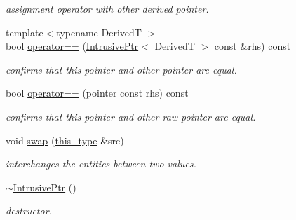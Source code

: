 \begin{DoxyCompactItemize}
\begin{DoxyCompactList}\small\item\em assignment operator with other derived pointer. \end{DoxyCompactList}\item 
\hypertarget{classhryky_1_1_intrusive_ptr_a9dde6dfd712df0d745d88494ab14354a}{{\footnotesize template$<$typename Derived\-T $>$ }\\bool \hyperlink{classhryky_1_1_intrusive_ptr_a9dde6dfd712df0d745d88494ab14354a}{operator==} (\hyperlink{classhryky_1_1_intrusive_ptr}{Intrusive\-Ptr}$<$ Derived\-T $>$ const \&rhs) const }\label{classhryky_1_1_intrusive_ptr_a9dde6dfd712df0d745d88494ab14354a}

\begin{DoxyCompactList}\small\item\em confirms that this pointer and other pointer are equal. \end{DoxyCompactList}\item 
\hypertarget{classhryky_1_1_intrusive_ptr_a8bc19fcb51130f7acfc810eddd01b1e7}{bool \hyperlink{classhryky_1_1_intrusive_ptr_a8bc19fcb51130f7acfc810eddd01b1e7}{operator==} (pointer const rhs) const }\label{classhryky_1_1_intrusive_ptr_a8bc19fcb51130f7acfc810eddd01b1e7}

\begin{DoxyCompactList}\small\item\em confirms that this pointer and other raw pointer are equal. \end{DoxyCompactList}\item 
\hypertarget{classhryky_1_1_intrusive_ptr_ab60b6a55a688776b82510c08c614709c}{void \hyperlink{classhryky_1_1_intrusive_ptr_ab60b6a55a688776b82510c08c614709c}{swap} (\hyperlink{classhryky_1_1_intrusive_ptr_a0fb00a7eafa8939e21653f677d1b2989}{this\-\_\-type} \&src)}\label{classhryky_1_1_intrusive_ptr_ab60b6a55a688776b82510c08c614709c}

\begin{DoxyCompactList}\small\item\em interchanges the entities between two values. \end{DoxyCompactList}\item 
\hypertarget{classhryky_1_1_intrusive_ptr_a3a97da2eb0bb0cab67e92e83b6a25ebc}{\hyperlink{classhryky_1_1_intrusive_ptr_a3a97da2eb0bb0cab67e92e83b6a25ebc}{$\sim$\-Intrusive\-Ptr} ()}\label{classhryky_1_1_intrusive_ptr_a3a97da2eb0bb0cab67e92e83b6a25ebc}

\begin{DoxyCompactList}\small\item\em destructor. \end{DoxyCompactList}\end{DoxyCompactItemize}
